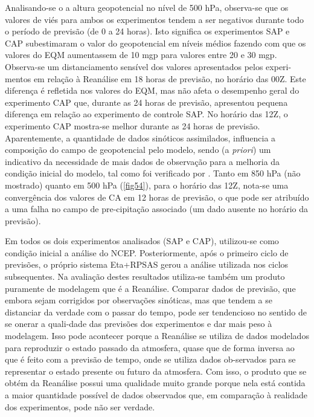 Analisando-se o a altura geopotencial no nível de 500 hPa, observa-se que os valores de viés para ambos os experimentos tendem a ser negativos durante todo o período de previsão (de 0 a 24 horas). Isto significa os experimentos SAP e CAP subestimaram o valor do geopotencial em níveis médios fazendo com que os valores do EQM aumentassem de 10 mgp para valores entre 20 e 30 mgp. Observa-se um distanciamento sensível dos valores apresentados pelos experi-mentos em relação à Reanálise em 18 horas de previsão, no horário das 00Z. Este diferença é refletida nos valores do EQM, mas não afeta o desempenho geral do experimento CAP que, durante as 24 horas de previsão, apresentou pequena diferença em relação ao experimento de controle SAP. No horário das 12Z, o experimento CAP mostra-se melhor durante as 24 horas de previsão. Aparentemente, a quantidade de dados sinóticos assimilados, influencia a composição do campo de geopotencial pelo modelo, sendo (a \textit{priori}) um indicativo da necessidade de mais dados de observação para a melhoria da condição inicial do modelo, tal como foi verificado por . Tanto em 850 hPa (não mostrado) quanto em 500 hPa (\autoref{fig54}), para o horário das 12Z, nota-se uma convergência dos valores de CA em 12 horas de previsão, o que pode ser atribuído a uma falha no campo de pre-cipitação associado (um dado ausente no horário da previsão).

Em todos os dois experimentos analisados (SAP e CAP), utilizou-se como condição inicial a análise do NCEP. Posteriormente, após o primeiro ciclo de previsões, o próprio sistema Eta+RPSAS gerou a análise utilizada nos ciclos subsequentes. Na avaliação destes resultados utiliza-se também um produto puramente de modelagem que é a Reanálise. Comparar dados de previsão, que embora sejam corrigidos por observações sinóticas, mas que tendem a se distanciar da verdade com o passar do tempo, pode ser tendencioso no sentido de se onerar a quali-dade das previsões dos experimentos e dar mais peso à modelagem. Isso pode acontecer porque a Reanálise se utiliza de dados modelados para reproduzir o estado passado da atmosfera, quase que de forma inversa ao que é feito com a previsão de tempo, onde se utiliza dados ob-servados para se representar o estado presente ou futuro da atmosfera. Com isso, o produto que se obtém da Reanálise possui uma qualidade muito grande porque nela está contida a maior quantidade possível de dados observados que, em comparação à realidade dos experimentos, pode não ser verdade.


